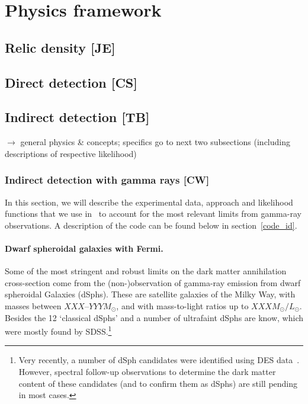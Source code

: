 \section{Physics framework}
\label{phys}


\subsection{Relic density {\bf [JE]}}
\label{phys_rd}

\subsection{Direct detection {\bf [CS]}}
\label{phys_dd}

\subsection{Indirect detection {\bf [TB]}}
\label{phys_id}

$\to$ general physics \& concepts; specifics go to next two subsections 
(including descriptions of respective likelihood)

\subsubsection{Indirect detection with gamma rays {\bf [CW]}}
\label{phys_ga}

In this section, we will describe the experimental data, approach and
likelihood functions that we use in \GB\ to account for the most relevant
limits from gamma-ray observations.  A description of the code can be found
below in section~\ref{code_id}.

\paragraph{Dwarf spheroidal galaxies with Fermi.}
Some of the most stringent and robust limits on the dark matter annihilation
cross-section come from the (non-)observation of gamma-ray emission from dwarf
spheroidal Galaxies (dSphs).  These are satellite galaxies of the Milky Way,
with masses between $XXX$--$YYY M_\odot$, and with mass-to-light ratios up to
$XXX M_\odot/L_\odot$.  Besides the 12 `classical dSphs' and a number of
ultrafaint dSphs are know, which were mostly found by SDSS.\footnote{Very
recently, a number of dSph candidates were identified using DES
data~\cite{123}.  However, spectral follow-up observations to
determine the dark matter content of these candidates (and to
confirm them as dSphs) are still pending in most cases.}  

